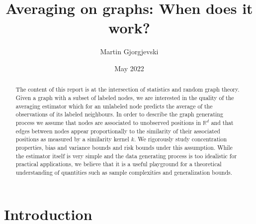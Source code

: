 \documentclass{article}
\title{Averaging on graphs: When does it work?}
\author{Martin Gjorgjevski}
\date{May 2022}
\begin{document}
\maketitle
\begin{abstract}
The content of this report is at the intersection of statistics and random graph theory.
Given a graph with a subset of labeled nodes, we are interested in the quality of the averaging estimator which for an unlabeled node predicts the average of the observations of its labeled neighbours. In order to describe the graph generating process we assume that nodes are associated to unobserved positions in $\mathbb{R}^d$ and that edges between nodes appear proportionally to the similarity of their associated positions as measured by a similarity kernel $k$. We rigorously study concentration properties, bias and variance bounds and
risk bounds under this assumption. While the estimator itself is very simple and the data generating process is too idealistic for practical applications, we believe that it is a useful playground for a theoretical understanding of quantities such as sample complexities and generalization bounds.
\end{abstract}



\tableofcontents




\section{Introduction}
\end{document}
